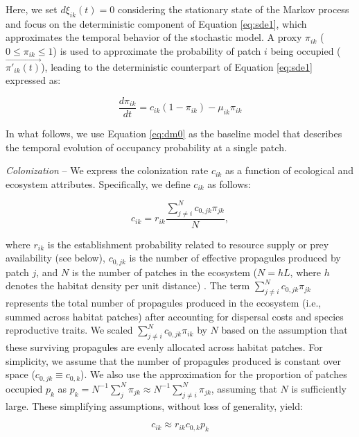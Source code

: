 \documentclass[11pt, class=article, crop=false]{standalone}
\begin{document}
Here, we set $d\xi_{ik}(t) = 0$ considering the stationary state of the Markov process and focus on the deterministic component of Equation \ref{eq:sde1}, which approximates the temporal behavior of the stochastic model.
A proxy $\pi_{ik}$ ($0 \le \pi_{ik} \le 1$) is used to approximate the probability of patch $i$ being occupied ($\overrightarrow{\pi'_{ik}(t)}$), leading to the deterministic counterpart of Equation \ref{eq:sde1} expressed as:

\begin{equation}
    \frac{d \pi_{ik}}{d t} = c_{ik} (1 - \pi_{ik}) - \mu_{ik} \pi_{ik}
    \label{eq:dm0}
\end{equation}

In what follows, we use Equation \ref{eq:dm0} as the baseline model that describes the temporal evolution of occupancy probability at a single patch.

\textit{Colonization} --
We express the colonization rate $c_{ik}$ as a function of ecological and ecosystem attributes.
Specifically, we define $c_{ik}$ as follows:

\begin{equation}
    c_{ik} = r_{ik} \frac{\sum_{j \ne i}^N c_{0, jk} \pi_{jk}}{N},
    \label{eq:clnz}
\end{equation}

where $r_{ik}$ is the establishment probability related to resource supply or prey availability (see below), $c_{0, jk}$ is the number of effective propagules produced by patch $j$, and $N$ is the number of patches in the ecosystem ($N = hL$, where $h$ denotes the habitat density per unit distance) .
The term $\sum_{j \ne i}^N c_{0, jk} \pi_{jk}$ represents the total number of propagules produced in the ecosystem (i.e., summed across habitat patches) after accounting for dispersal costs and species reproductive traits.
We scaled $\sum_{j \ne i}^N c_{0, jk} \pi_{ik}$ by $N$ based on the assumption that these surviving propagules are evenly allocated across habitat patches.
For simplicity, we assume that the number of propagules produced is constant over space ($c_{0, jk} \equiv c_{0, k}$).
We also use the approximation for the proportion of patches occupied $p_k$ as $p_k = N^{-1}\sum_{j}^N \pi_{jk} \approx N^{-1}\sum_{j \ne i}^N \pi_{jk}$, assuming that $N$ is sufficiently large.
These simplifying assumptions, without loss of generality, yield:

\begin{equation}
     c_{ik} \approx r_{ik} c_{0, k} p_k
\end{equation}
\end{document}
